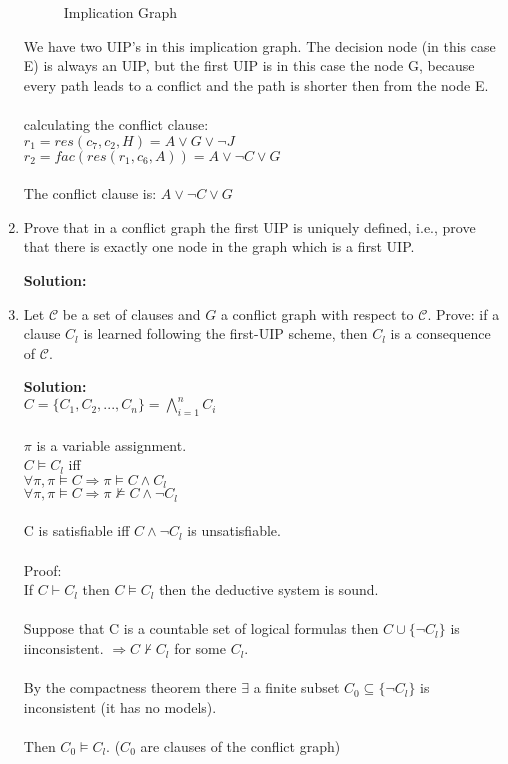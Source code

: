 \documentclass[11pt,a4paper]{uebung}
\newcommand{\solution}[1]{\par {\bf Solution:}\\#1}
\begin{document}
\begin{enumerate}
{\begin{figure}[h]
    \caption{Implication Graph}
    \label{fig:ig}
  \end{figure}
  
  We have two UIP's in this implication graph. The decision node (in this case E) is always an UIP, but the first UIP is in this case the node G, because every path leads to a conflict and the path is shorter then from the node E.\\
  \\
  calculating the conflict clause:\\
  $r_1 = res(c_7, c_2, H) = A \vee G \vee \neg J$\\
  $r_2 = fac(res(r_1, c_6, A)) = A \vee \neg C \vee G$\\
  \\
  The conflict clause is: $A \vee \neg C \vee G$
  
  }

\item Prove that in a conflict graph the first UIP is uniquely defined, i.e.,
  prove that there is exactly one node in the graph which is a first UIP.

  \solution{
  }

\item Let $\mathcal{C}$ be a set of clauses and $G$ a conflict graph with
  respect to $\mathcal{C}$. Prove: if a clause $C_l$ is learned following the
  first-UIP scheme, then $C_l$ is a consequence of $\mathcal{C}$.

  \solution{
  
  $C=\{C_1, C_2,... ,C_n\} = \bigwedge_{i=1}^{n} C_i$\\
  \\
  $\pi$ is a variable assignment.\\
  $C \vDash C_l$ iff\\
  $\forall \pi, \pi \vDash C \Rightarrow \pi \vDash C \wedge C_l$\\
  $\forall \pi, \pi \vDash C \Rightarrow \pi \nvDash C \wedge \neg C_l$\\
  \\
  C is satisfiable iff $C \wedge \neg C_l$ is unsatisfiable.\\
  \\
  Proof:\\
  If $C \vdash C_l$ then $C \vDash C_l$ then the deductive system is sound.\\
  \\
  Suppose that C is a countable set of logical formulas then $C \cup \{\neg C_l\}$ is iinconsistent.
  $\Rightarrow C \nvdash C_l$ for some $C_l$.\\
  \\
  By the compactness theorem there $\exists$ a finite subset $C_0 \subseteq \{\neg C_l\}$ is inconsistent (it has no models).\\
  \\
  Then $C_0 \vDash C_l$. ($C_0$ are clauses of the conflict graph)
  
  }
\end{enumerate}
\end{document}
